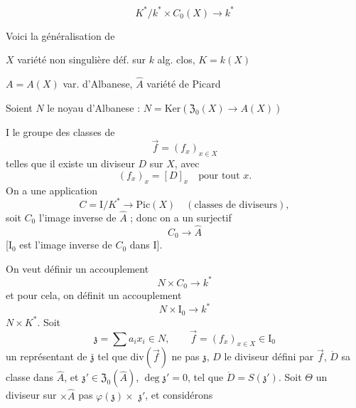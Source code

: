 \documentclass[11pt,a4paper]{article}
\begin{document}

\[
\boxed{\;K^{*}/k^{*} \times C_0(X) \longrightarrow k^{*}\;}
\]


Voici la généralisation de 

$X$ variété non singulière déf. sur $k$ alg. clos, $K = k(X)$

$A = A(X)$ var. d'Albanese, 
$\hat{A}$ variété de Picard

Soient $N$ le noyau d'Albanese : $N = \mathrm{Ker}(\mathfrak{Z}_0(X)
\to A(X))$

\struck{\ill{}} $\mathrm{I}$ le groupe des classes de
\[
\vec{f} = (f_x)_{x \in X}
\]
telles que il existe un diviseur $D$ sur $X$, avec
\[
(f_x)_x = [D]_x \quad \text{pour tout } x.
\]
On a une application
\[
C = \mathrm{I}/K^{*} \longrightarrow \mathrm{Pic}(X)
\quad (\text{classes de diviseurs}),
\]
soit $C_0$ \struck{\ill{}} l'image inverse de $\hat{A}$ ; donc on a un
 surjectif
\[
C_0 \longrightarrow \hat{A}
\]
[$\mathrm{I}_0$ est l'image inverse de $C_0$ dans $\mathrm{I}$].

On veut définir un accouplement
\[
N \times C_0 \longrightarrow k^{*}
\]
et pour cela, on définit un accouplement
\[
N \times \mathrm{I}_0 \longrightarrow k^{*}
\]
 $N \times K^{*}$. Soit 
\[
\mathfrak{z} = \sum a_i x_i \in N, \qquad
\vec{f} = (f_x)_{x \in X} \in \mathrm{I}_0
\]
un représentant de $\bar{\mathfrak{z}}$ tel que $\mathrm{div}(\vec{f})$ ne
 pas $\mathfrak{z}$,
$D$ le diviseur défini par $\vec{f}$, \struck{\ill{}} $\dot{D}$ sa classe
dans $\hat{A}$, et $\mathfrak{z}' \in \mathfrak{Z}_0(\hat{A})$,
\struck{\ill{}} $\deg \mathfrak{z}' = 0$, tel que $\dot{D} =
S(\mathfrak{z}')$. Soit  $\Theta$ un diviseur
 sur  $\times \hat{A}$  pas $\varphi(\mathfrak{z}) \times{}$ \struck{\ill{}}
$\mathfrak{z}'$, et considérons
\end{document}
